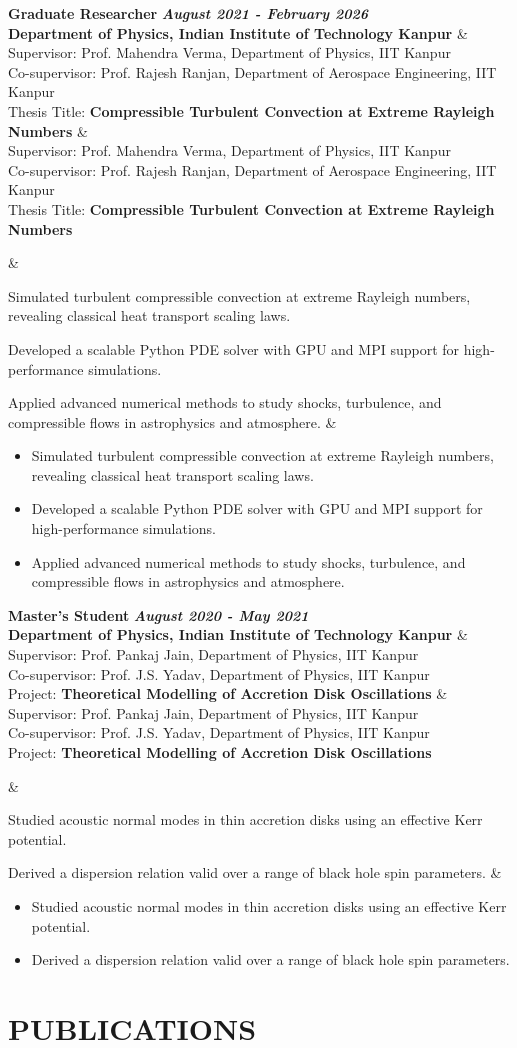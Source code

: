 \documentclass[10pt,a4paper]{article}
\newcommand{\experienceentry}[5]{
  \noindent
  \begin{minipage}[t]{0.04\textwidth}
    \vspace{0.2ex}
    \textcolor{cvblue}{\large\faBookOpen}
  \end{minipage}%
  \begin{minipage}[t]{0.96\textwidth}
    \textbf{#1} \hfill \textbf{\textit{#2}} \\
    \textcolor{cvblue}{\textbf{#3}}
    \ifx&#4&%
    \else
      \vspace{0.5ex} \\ #4
    \fi
    \ifx&#5&%
    \else
      \begin{itemize}[leftmargin=1.2em, nosep, topsep=3pt]
        #5
      \end{itemize}
    \fi
  \end{minipage}
  \vspace{1.5ex}
}
\begin{document}
\experienceentry
  {Graduate Researcher}
  {August 2021 - February 2026}
  {Department of Physics, Indian Institute of Technology Kanpur}
  {
    Supervisor: Prof. Mahendra Verma, Department of Physics, IIT Kanpur \\
    Co-supervisor: Prof. Rajesh Ranjan, Department of Aerospace Engineering, IIT Kanpur \\
    Thesis Title: \textcolor{cvblue}{\textbf{Compressible Turbulent Convection at Extreme Rayleigh Numbers}}
  }
  {
    \item Simulated turbulent compressible convection at extreme Rayleigh numbers, revealing classical heat transport scaling laws.
    \item Developed a scalable Python PDE solver with GPU and MPI support for high-performance simulations.
    \item Applied advanced numerical methods to study shocks, turbulence, and compressible flows in astrophysics and atmosphere.
  }

\experienceentry
  {Master's Student}
  {August 2020 - May 2021}
  {Department of Physics, Indian Institute of Technology Kanpur}
  {
    Supervisor: Prof. Pankaj Jain, Department of Physics, IIT Kanpur \\
    Co-supervisor: Prof. J.S. Yadav, Department of Physics, IIT Kanpur \\
    Project: \textcolor{cvblue}{\textbf{Theoretical Modelling of Accretion Disk Oscillations}}
  }
  {
    \item Studied acoustic normal modes in thin accretion disks using an effective Kerr potential.
    \item Derived a dispersion relation valid over a range of black hole spin parameters.
  }

\section{PUBLICATIONS}
\end{document}
